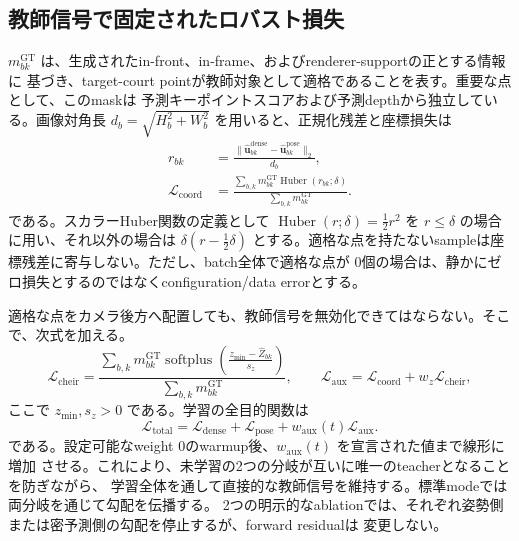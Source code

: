 \subsection{教師信号で固定されたロバスト損失}

\(m^{\mathrm{GT}}_{bk}\) は、生成されたin-front、in-frame、およびrenderer-supportの正とする情報に
基づき、target-court pointが教師対象として適格であることを表す。重要な点として、このmaskは
予測キーポイントスコアおよび予測depthから独立している。画像対角長
\(d_b=\sqrt{H_b^2+W_b^2}\) を用いると、正規化残差と座標損失は
\begin{align}
  r_{bk}
    &=\frac{\|\widehat{\mathbf{u}}^{\mathrm{dense}}_{bk}
              -\widehat{\mathbf{u}}^{\mathrm{pose}}_{bk}\|_2}{d_b}, \\
  \mathcal{L}_{\mathrm{coord}}
    &=\frac{\sum_{b,k}m^{\mathrm{GT}}_{bk}
      \operatorname{Huber}(r_{bk};\delta)}
      {\sum_{b,k}m^{\mathrm{GT}}_{bk}}.
  \label{eq:coordinate_loss}
\end{align}
である。スカラーHuber関数の定義として
\(
  \operatorname{Huber}(r;\delta)=\tfrac12r^2
\)
を \(r\leq\delta\) の場合に用い、それ以外の場合は
\(
  \delta(r-\tfrac12\delta)
\)
とする。適格な点を持たないsampleは座標残差に寄与しない。ただし、batch全体で適格な点が
0個の場合は、静かにゼロ損失とするのではなくconfiguration/data errorとする。

適格な点をカメラ後方へ配置しても、教師信号を無効化できてはならない。そこで、次式を加える。
\begin{equation}
  \mathcal{L}_{\mathrm{cheir}}=
  \frac{\sum_{b,k}m^{\mathrm{GT}}_{bk}
    \operatorname{softplus}\!\left(
      \frac{z_{\min}-\widehat Z_{bk}}{s_z}\right)}
       {\sum_{b,k}m^{\mathrm{GT}}_{bk}},
  \qquad
  \mathcal{L}_{\mathrm{aux}}=
     \mathcal{L}_{\mathrm{coord}}+w_z\mathcal{L}_{\mathrm{cheir}},
  \label{eq:cheirality}
\end{equation}
ここで \(z_{\min},s_z>0\) である。学習の全目的関数は
\begin{equation}
  \mathcal{L}_{\mathrm{total}}=
  \mathcal{L}_{\mathrm{dense}}+\mathcal{L}_{\mathrm{pose}}
  +w_{\mathrm{aux}}(t)\mathcal{L}_{\mathrm{aux}}.
  \label{eq:total_loss}
\end{equation}
である。設定可能なweight 0のwarmup後、\(w_{\mathrm{aux}}(t)\) を宣言された値まで線形に増加
させる。これにより、未学習の2つの分岐が互いに唯一のteacherとなることを防ぎながら、
学習全体を通して直接的な教師信号を維持する。標準modeでは両分岐を通じて勾配を伝播する。
2つの明示的なablationでは、それぞれ姿勢側または密予測側の勾配を停止するが、forward residualは
変更しない。

